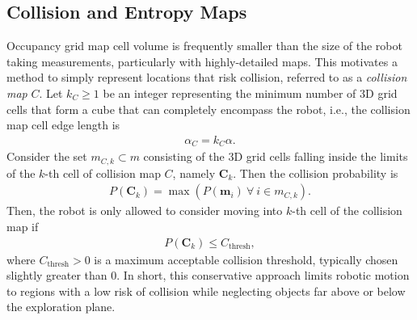 \subsection{Collision and Entropy Maps}
Occupancy grid map cell volume is frequently smaller than the size of the robot taking measurements, particularly with highly-detailed maps. This motivates a method to simply represent locations that risk collision, referred to as a \emph{collision map} $C$. Let $k_C\geq1$ be an integer representing the minimum number of 3D grid cells that form a cube that can completely encompass the robot, i.e., the collision map cell edge length is
\begin{align}
\label{eqn:alphaC}
\alpha_C=k_C\alpha.
\end{align}
Consider the set $ m_{C,k}\subset m$ consisting of the 3D grid cells falling inside the limits of the $k$-th cell of collision map $C$, namely $\mathbf{C}_k$. Then the collision probability is
\begin{align}
P(\mathbf{C}_k)=\max{(P(\mathbf{m}_i)\ \forall \ i\in m_{C,k})}.
\end{align}
Then, the robot is only allowed to consider moving into $k$-th cell of the collision map if
\begin{align}
P(\mathbf{C}_k) \leq C_\text{thresh},
\end{align}
where $C_\text{thresh}>0$ is a maximum acceptable collision threshold, typically chosen slightly greater than $0$. In short, this conservative approach limits robotic motion to regions with a low risk of collision while neglecting objects far above or below the exploration plane.

